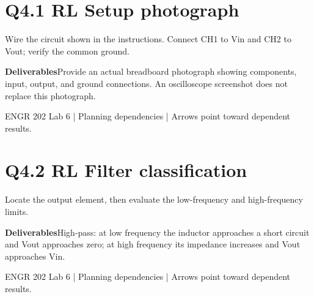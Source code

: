 \documentclass[11pt]{article}
\begin{document}
\section*{Q4.1 RL Setup photograph}
Wire the circuit shown in the instructions. Connect CH1 to Vin and CH2 to Vout; verify the common ground.\par\medskip
\textbf{Deliverables}\quad Provide an actual breadboard photograph showing components, input, output, and ground connections. An oscilloscope screenshot does not replace this photograph.\par\bigskip
\begin{center}\end{center}
\vfill\small ENGR 202 Lab 6 | Planning dependencies | Arrows point toward dependent results.
\newpage
\section*{Q4.2 RL Filter classification}
Locate the output element, then evaluate the low-frequency and high-frequency limits.\par\medskip
\textbf{Deliverables}\quad High-pass: at low frequency the inductor approaches a short circuit and Vout approaches zero; at high frequency its impedance increases and Vout approaches Vin.\par\bigskip
\begin{center}\end{center}
\vfill\small ENGR 202 Lab 6 | Planning dependencies | Arrows point toward dependent results.
\newpage
\end{document}
